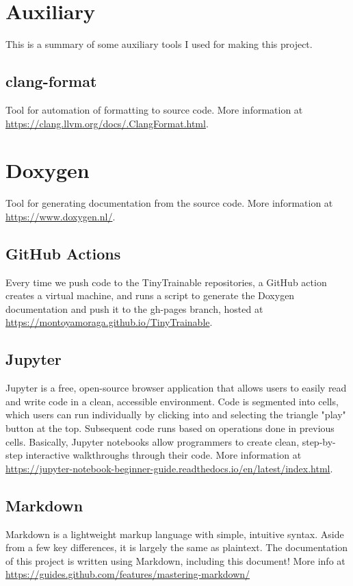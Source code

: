\section{Auxiliary}

This is a summary of some auxiliary tools I used for making this project.

\subsection{clang-format}

Tool for automation of formatting to source code. More information at \url{https://clang.llvm.org/docs/.ClangFormat.html}.

\section{Doxygen}

Tool for generating documentation from the source code. More information at \url{https://www.doxygen.nl/}.

\subsection{GitHub Actions}

Every time we push code to the TinyTrainable repositories, a GitHub action creates a virtual machine, and runs a script to generate the Doxygen documentation and push it to the gh-pages branch, hosted at \url{https://montoyamoraga.github.io/TinyTrainable}.

\subsection{Jupyter}

Jupyter is a free, open-source browser application that allows users to easily read and write code in a clean, accessible environment. Code is segmented into cells, which users can run individually by clicking into and selecting the triangle "play" button at the top. Subsequent code runs based on operations done in previous cells. Basically, Jupyter notebooks allow programmers to create clean, step-by-step interactive walkthroughs through their code. More information at \url{https://jupyter-notebook-beginner-guide.readthedocs.io/en/latest/index.html}.
\subsection{Markdown}

Markdown is a lightweight markup language with simple, intuitive syntax. Aside from a few key differences, it is largely the same as plaintext. The documentation of this project is written using Markdown, including this document! More info at \url{https://guides.github.com/features/mastering-markdown/}
